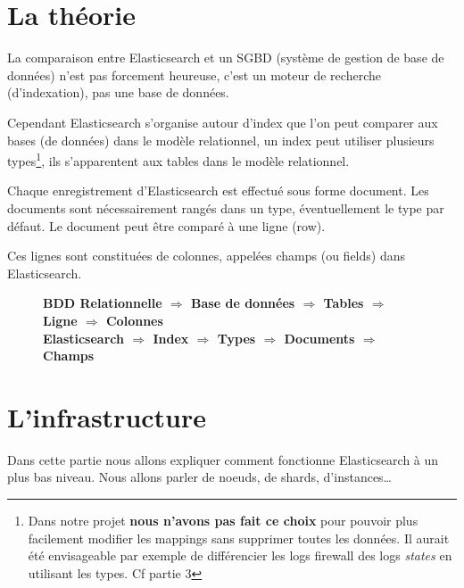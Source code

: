 \section{La théorie}
{%

La comparaison entre Elasticsearch et un SGBD (système de gestion de base de données) 
n'est pas forcement heureuse, c'est un moteur de recherche (d'indexation), pas une 
base de données. 

Cependant Elasticsearch s'organise autour d'index que l'on peut comparer aux bases (de données)
dans le modèle relationnel, un index peut utiliser plusieurs types\footnote{Dans 
notre projet \textbf{nous n'avons pas fait ce choix} pour pouvoir plus facilement 
modifier les mappings sans supprimer toutes les données. Il aurait été envisageable
par exemple de différencier les logs firewall des logs \textit{states} en utilisant 
les types. Cf partie 3}, ils s'apparentent aux tables dans le modèle relationnel. 

Chaque enregistrement d'Elasticsearch est effectué sous forme document. Les documents
sont nécessairement rangés dans un type, éventuellement le type par défaut. Le document 
peut être comparé à une ligne (row). 

Ces lignes sont constituées de colonnes, appelées champs (ou fields) dans Elasticsearch.

\begin{figure}[H]
\textbf{BDD Relationnelle $\Rightarrow$ Base de données $\Rightarrow$ Tables $\Rightarrow$ Ligne $\Rightarrow$ Colonnes\\
Elasticsearch \hspace{7mm} $\Rightarrow$ \hspace{8mm }Index \hspace{8mm} $\Rightarrow$ \hspace{3mm}Types \hspace{3mm} $\Rightarrow$ Documents $\Rightarrow$ Champs}
\end{figure}


\section{L'infrastructure}
Dans cette partie nous allons expliquer comment fonctionne Elasticsearch à un plus 
bas niveau. Nous allons parler de noeuds, de shards, d'instances\ldots

}
